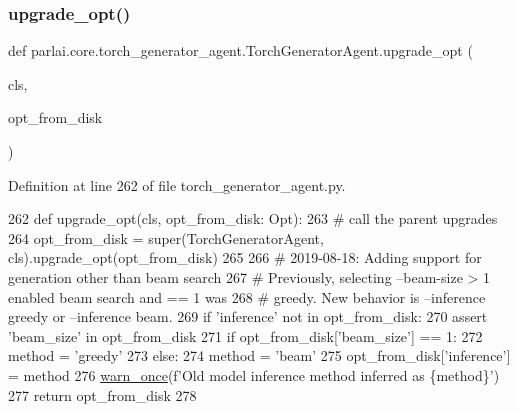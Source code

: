 \subsubsection{\texorpdfstring{upgrade\+\_\+opt()}{upgrade\_opt()}}
{\footnotesize\ttfamily def parlai.\+core.\+torch\+\_\+generator\+\_\+agent.\+Torch\+Generator\+Agent.\+upgrade\+\_\+opt (\begin{DoxyParamCaption}\item[{}]{cls,  }\item[{}]{opt\+\_\+from\+\_\+disk }\end{DoxyParamCaption})}



Definition at line 262 of file torch\+\_\+generator\+\_\+agent.\+py.


\begin{DoxyCode}
262     \textcolor{keyword}{def }upgrade\_opt(cls, opt\_from\_disk: Opt):
263         \textcolor{comment}{# call the parent upgrades}
264         opt\_from\_disk = super(TorchGeneratorAgent, cls).upgrade\_opt(opt\_from\_disk)
265 
266         \textcolor{comment}{# 2019-08-18: Adding support for generation other than beam search}
267         \textcolor{comment}{# Previously, selecting --beam-size > 1 enabled beam search and == 1 was}
268         \textcolor{comment}{# greedy. New behavior is --inference greedy or --inference beam.}
269         \textcolor{keywordflow}{if} \textcolor{stringliteral}{'inference'} \textcolor{keywordflow}{not} \textcolor{keywordflow}{in} opt\_from\_disk:
270             \textcolor{keyword}{assert} \textcolor{stringliteral}{'beam\_size'} \textcolor{keywordflow}{in} opt\_from\_disk
271             \textcolor{keywordflow}{if} opt\_from\_disk[\textcolor{stringliteral}{'beam\_size'}] == 1:
272                 method = \textcolor{stringliteral}{'greedy'}
273             \textcolor{keywordflow}{else}:
274                 method = \textcolor{stringliteral}{'beam'}
275             opt\_from\_disk[\textcolor{stringliteral}{'inference'}] = method
276             \hyperlink{namespaceparlai_1_1utils_1_1misc_a884a3aefa90581f53bc592fa6a78dc43}{warn\_once}(f\textcolor{stringliteral}{'Old model inference method inferred as \{method\}'})
277         \textcolor{keywordflow}{return} opt\_from\_disk
278 
\end{DoxyCode}
\mbox{\label{classparlai_1_1core_1_1torch__generator__agent_1_1TorchGeneratorAgent_a66f36d7201bc1b9a019d3525a5934cf7}} 
